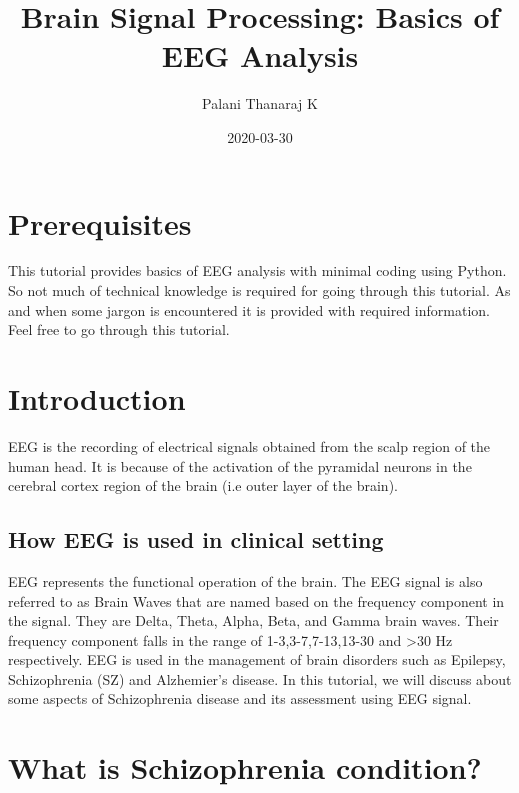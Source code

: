 \documentclass[]{book}
\title{Brain Signal Processing: Basics of EEG Analysis}
\author{Palani Thanaraj K}
\date{2020-03-30}
\begin{document}
\maketitle

{
\setcounter{tocdepth}{1}
\tableofcontents
}
\hypertarget{prerequisites}{%
\chapter*{Prerequisites}\label{prerequisites}}

This tutorial provides basics of EEG analysis with minimal coding using Python. So not much of technical knowledge is required for going through this tutorial. As and when some jargon is encountered it is provided with required information. Feel free to go through this tutorial.

\hypertarget{intro}{%
\chapter{Introduction}\label{intro}}

EEG is the recording of electrical signals obtained from the scalp region of the human head. It is because of the activation of the pyramidal neurons in the cerebral cortex region of the brain (i.e outer layer of the brain).

\hypertarget{how-eeg-is-used-in-clinical-setting}{%
\section{How EEG is used in clinical setting}\label{how-eeg-is-used-in-clinical-setting}}

EEG represents the functional operation of the brain. The EEG signal is also referred to as Brain Waves that are named based on the frequency component in the signal. They are Delta, Theta, Alpha, Beta, and Gamma brain waves. Their frequency component falls in the range of 1-3,3-7,7-13,13-30 and \textgreater30 Hz respectively. EEG is used in the management of brain disorders such as Epilepsy, Schizophrenia (SZ) and Alzhemier's disease. In this tutorial, we will discuss about some aspects of Schizophrenia disease and its assessment using EEG signal.

\hypertarget{what-is-schizophrenia-condition}{%
\chapter{What is Schizophrenia condition?}\label{what-is-schizophrenia-condition}}
\end{document}
